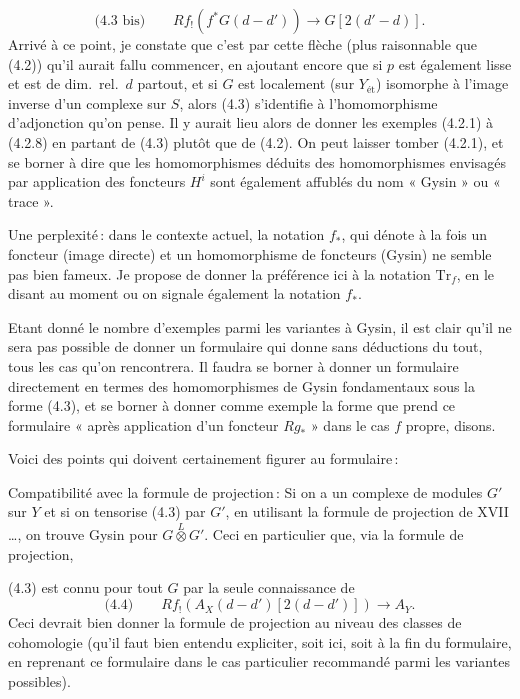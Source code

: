\documentclass[11pt,a4paper]{article}
\begin{document}
\[
\text{(4.3 bis)}\qquad Rf_{!}(f^{*}G(d-d')) \longrightarrow G[2(d'-d)] .
\]
Arrivé à ce point, je constate que c'est par cette flèche  (plus
raisonnable que (4.2)) qu'il aurait fallu commencer, en ajoutant encore que
si $p$ est également lisse et est de dim.\ rel.\ $d$ partout, et si $G$ est
localement (sur $Y_{\text{ét}}$) isomorphe à l'image inverse d'un complexe
sur $S$, alors (4.3) s'identifie à l'homomorphisme d'adjonction qu'on pense.
Il y aurait lieu alors de donner les exemples (4.2.1) à (4.2.8) en partant
de (4.3) plutôt que de (4.2). On peut laisser tomber (4.2.1), et se borner
à dire que les homomorphismes déduits des homomorphismes envisagés par
application des foncteurs $H^i$ sont également affublés du nom « Gysin » ou
« trace ».

Une perplexité\,: dans le contexte actuel, la notation $f_{*}$, qui dénote
à la fois un foncteur (image directe) et un homomorphisme de foncteurs
(Gysin) ne semble pas bien fameux. Je propose de donner la préférence ici à
la notation $\mathrm{Tr}_f$, en le disant au moment ou on signale également
la notation $f_{*}$.

Etant donné le nombre d'exemples parmi les variantes à Gysin, il est clair
qu'il ne sera pas possible de donner un formulaire qui donne
 sans déductions du tout, tous les cas qu'on
rencontrera. Il faudra se borner à donner un formulaire directement en
termes des homomorphismes de Gysin fondamentaux sous la forme (4.3), et se
borner à donner comme exemple la forme que prend ce formulaire « après
application d'un foncteur $Rg_{*}$ » dans le cas $f$ propre, disons.

Voici des points qui doivent certainement figurer au formulaire\,:

 Compatibilité avec la formule de projection\,: Si on a un
complexe de modules $G'$ sur $Y$ et si on tensorise (4.3) par $G'$, en
utilisant la formule de projection de XVII …, on trouve Gysin pour
$G \overset{L}{\otimes} G'$. Ceci   en
particulier que, via la formule de projection,

(4.3) est connu pour tout $G$ par la seule connaissance de
\[
\text{(4.4)}\qquad Rf_{!}(A_X(d-d')[2(d-d')]) \longrightarrow A_Y .
\]
Ceci devrait bien donner la formule de projection au niveau des classes de
cohomologie (qu'il faut bien entendu expliciter, soit ici, soit 
à la fin du formulaire, en reprenant ce formulaire dans le cas particulier
recommandé\supplied{,} parmi les variantes possibles).
\end{document}
